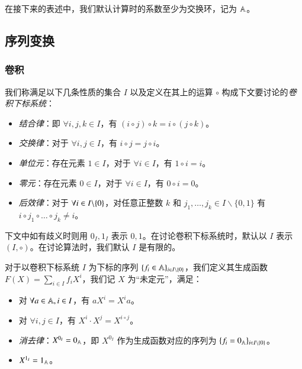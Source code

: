 在接下来的表述中，我们默认计算时的系数至少为交换环，记为 $\mathbb A$。

\subsection{序列变换}

\subsubsection{卷积}

\begin{definition} [卷积下标系统]
我们称满足以下几条性质的集合 $I$ 以及定义在其上的运算 $\circ$ 构成下文要讨论的\emph{卷积下标系统}：
\begin{itemize}
\item \emph{结合律}：即 $\forall i,j,k\in I$，有 $(i\circ j)\circ k = i\circ(j\circ k)$。
\item \emph{交换律}：对于 $\forall i,j\in I$，有 $i\circ j = j\circ i$。
\item \emph{单位元}：存在元素 $1 \in I$，对于 $\forall i\in I$，有 $1\circ i = i$。
\item \emph{零元}：存在元素 $0\in I$，对于 $\forall i\in I$，有 $0\circ i = 0$。
\item \emph{后效律}：对于 $\forall i \in {I \backslash \{0\}}$，对任意正整数 $k$ 和 $j_1,\dots,j_k \in I\backslash \{0,1\}$ 有 $i\circ j_1\circ \dots \circ j_k \neq i$。
\end{itemize}
下文中如有歧义时则用 $0_I, 1_I$ 表示 $0,1$。在讨论卷积下标系统时，默认以 $I$ 表示 $(I, \circ)$。在讨论算法时，我们默认 $I$ 是有限的。
\end{definition}

\begin{definition} [生成函数]
对于以卷积下标系统 $I$ 为下标的序列 $\{f_i \in \mathbb A\}_{i\in {I \backslash \{0\}}}$，我们定义其生成函数 $F(X) = \sum_{i\in I} f_i X^i$，我们记 $X$ 为“未定元”，满足：

\begin{itemize}
\item 对 $\forall a\in \mathbb A, i\in I$，有 $aX^i = X^i a$。
\item 对 $\forall i,j\in I$，有 $X^i \cdot X^j = X^{i\circ j}$。
\item \emph{消去律}：$X^{0_I} = 0_{\mathbb A}$，即 $X^{0_I}$ 作为生成函数对应的序列为 $\{f_i = 0_{\mathbb A}\}_{i\in {I \backslash \{0\}}}$。
\item $X^{1_I} = 1_{\mathbb A}$。
\end{itemize}

\end{definition}

